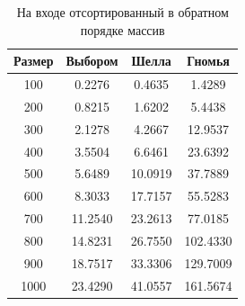 \begin{table}[h]
	\begin{center}
		\begin{threeparttable}
		\captionsetup{justification=raggedleft,singlelinecheck=off}
		\caption{На входе отсортированный в обратном порядке массив}
		\label{tbl:worst}
		\begin{tabular}{|c|c|c|c|}
			\hline
			Размер & Выбором & Шелла & Гномья \\
			\hline
  			100 & 0.2276 & 0.4635 & 1.4289 \\ 
 			\hline
  			200 & 0.8215 & 1.6202 & 5.4438 \\ 
 			\hline
  			300 & 2.1278 & 4.2667 & 12.9537 \\ 
 			\hline
  			400 & 3.5504 & 6.6461 & 23.6392 \\ 
 			\hline
  			500 & 5.6489 & 10.0919 & 37.7889 \\ 
 			\hline
  			600 & 8.3033 & 17.7157 & 55.5283 \\ 
 			\hline
  			700 & 11.2540 & 23.2613 & 77.0185 \\ 
			\hline
  			800 & 14.8231 & 26.7550 & 102.4330 \\ 
 			\hline
  			900 & 18.7517 & 33.3306 & 129.7009 \\ 
 			\hline
 			1000 & 23.4290 & 41.0557 & 161.5674 \\ 
 			\hline
		\end{tabular}
		\end{threeparttable}
    \end{center}
\end{table}

\clearpage

